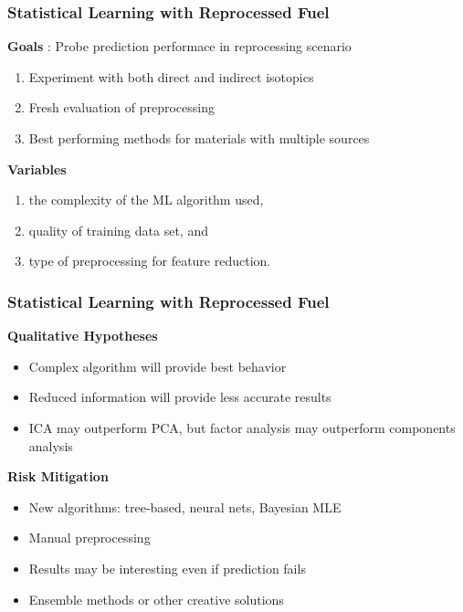 
\begin{frame}
  \frametitle{Statistical Learning with Reprocessed Fuel}
  \textbf{Goals} : Probe prediction performace in reprocessing scenario 
  \begin{enumerate}
    \item Experiment with both direct and indirect isotopics
    \item Fresh evaluation of preprocessing 
    \item Best performing methods for materials with multiple sources
  \end{enumerate}
  
  \textbf{Variables}
  \begin{enumerate}
    \item the complexity of the ML algorithm used,
    \item quality of training data set, and 
    \item type of preprocessing for feature reduction.
  \end{enumerate}
\end{frame}

\begin{frame}
  \frametitle{Statistical Learning with Reprocessed Fuel}
  \textbf{Qualitative Hypotheses}
  \begin{itemize}
    \item Complex algorithm will provide best behavior
    \item Reduced information will provide less accurate results
    \item ICA may outperform PCA, but factor analysis may outperform components
    analysis \cite{nicolaou_2006, nicolaou_2009, nicolaou_2014, robel_2009,
    pu_discrimination, jones_viz_2014, jones_snf_2014}
  \end{itemize}
 
 \textbf{Risk Mitigation}
  \begin{itemize}
    \item New algorithms: tree-based, neural nets, Bayesian MLE
    \item Manual preprocessing
    \item Results may be interesting even if prediction fails
    \item Ensemble methods or other creative solutions \cite{robel_2009, pu_discrimination}
  \end{itemize}
\end{frame}


